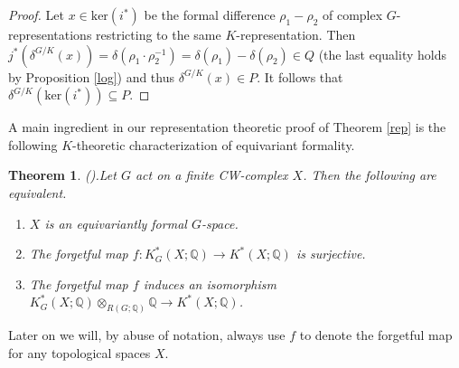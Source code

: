 \documentclass[11pt]{amsart}
\theoremstyle{plain}
\newtheorem{theorem}{Theorem}[section]
\theoremstyle{definition}
\begin{document}
\begin{proof}
	Let $x\in\text{ker}(i^*)$ be the formal difference $\rho_1-\rho_2$ of complex $G$-representations restricting to the same $K$-representation. Then $j^*(\delta^{G/K}(x))=\delta(\rho_1\cdot\rho_2^{-1})=\delta(\rho_1)-\delta(\rho_2)\in Q$ (the last equality holds by Proposition \ref{log}) and thus $\delta^{G/K}(x)\in P$. It follows that $\delta^{G/K}(\text{ker}(i^*))\subseteq P$.
\end{proof}
A main ingredient in our representation theoretic proof of Theorem \ref{rep} is the following $K$-theoretic characterization of equivariant formality.
\begin{theorem}\textnormal{(\cite[Theorem 1.3]{F2}).}\label{RKEF} Let $G$ act on a finite CW-complex $X$. Then the following are equivalent. 
\begin{enumerate}
	\item $X$ is an equivariantly formal $G$-space.
	\item The forgetful map $f: K_G^*(X; \mathbb{Q})\to K^*(X; \mathbb{Q})$ is surjective. 
	\item The forgetful map $f$ induces an isomorphism $K_G^*(X; \mathbb{Q})\otimes_{R(G; \mathbb{Q})}\mathbb{Q}\to K^*(X; \mathbb{Q})$.
\end{enumerate}
\end{theorem}
Later on we will, by abuse of notation, always use $f$ to denote the forgetful map for any topological spaces $X$. 
\end{document}
